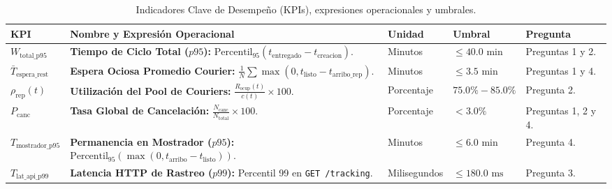 \documentclass[11pt,letterpaper]{article}
\begin{document}
\begin{table}[htbp]
\centering
\small
\caption{Indicadores Clave de Desempeño (KPIs), expresiones operacionales y umbrales.}
\begin{tabularx}{\textwidth}{p{2.5cm} p{6.0cm} p{1.8cm} p{2.5cm} X}
\toprule
\textbf{KPI} & \textbf{Nombre y Expresión Operacional} & \textbf{Unidad} & \textbf{Umbral} & \textbf{Pregunta} \\
\midrule
$W_{\text{total\_p95}}$ & \textbf{Tiempo de Ciclo Total ($p95$):} $\text{Percentil}_{95}(t_{\text{entregado}} - t_{\text{creacion}})$. & Minutos & $\le 40.0\text{ min}$ & Preguntas 1 y 2. \\
$\bar{T}_{\text{espera\_rest}}$ & \textbf{Espera Ociosa Promedio Courier:} $\frac{1}{N} \sum \max(0, t_{\text{listo}} - t_{\text{arribo\_rep}})$. & Minutos & $\le 3.5\text{ min}$ & Preguntas 1 y 4. \\
$\rho_{\text{rep}}(t)$ & \textbf{Utilización del Pool de Couriers:} $\frac{R_{\text{ocup}}(t)}{c(t)} \times 100$. & Porcentaje & $75.0\% - 85.0\%$ & Pregunta 2. \\
$P_{\text{canc}}$ & \textbf{Tasa Global de Cancelación:} $\frac{N_{\text{canc}}}{N_{\text{total}}} \times 100$. & Porcentaje & $< 3.0\%$ & Preguntas 1, 2 y 4. \\
$T_{\text{mostrador\_p95}}$ & \textbf{Permanencia en Mostrador ($p95$):} $\text{Percentil}_{95}(\max(0, t_{\text{arribo}} - t_{\text{listo}}))$. & Minutos & $\le 6.0\text{ min}$ & Pregunta 4. \\
$T_{\text{lat\_api\_p99}}$ & \textbf{Latencia HTTP de Rastreo ($p99$):} Percentil 99 en \texttt{GET /tracking}. & Milisegundos & $\le 180.0\text{ ms}$ & Pregunta 3. \\
\bottomrule
\end{tabularx}
\end{table}
\end{document}
